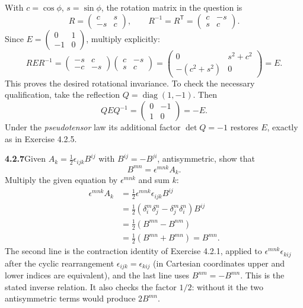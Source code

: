 With $c=\cos\phi$, $s=\sin\phi$, the rotation matrix in the question is
\[
R=\begin{pmatrix}c&s\\-s&c\end{pmatrix},\qquad
R^{-1}=R^{\mathsf T}=\begin{pmatrix}c&-s\\s&c\end{pmatrix}.
\]
Since $E=\begin{pmatrix}0&1\\-1&0\end{pmatrix}$, multiply explicitly:
\[
RER^{-1}
=\begin{pmatrix}-s&c\\-c&-s\end{pmatrix}
 \begin{pmatrix}c&-s\\s&c\end{pmatrix}
=\begin{pmatrix}0&s^2+c^2\\-(c^2+s^2)&0\end{pmatrix}
=E.
\]
This proves the desired rotational invariance. To check the necessary
qualification, take the reflection $Q=\operatorname{diag}(1,-1)$.
Then
\[
QEQ^{-1}=\begin{pmatrix}0&-1\\1&0\end{pmatrix}=-E.
\]
Under the \emph{pseudotensor} law its additional factor $\det Q=-1$
restores $E$, exactly as in Exercise 4.2.5.

\par\bigskip
\noindent\textbf{4.2.7}\quad Given
$A_{k}=\frac{1}{2}\epsilon_{ijk}B^{ij}$ with $B^{ij}=-B^{ji}$, antisymmetric,
show that
\[
B^{mn}=\epsilon^{mnk}A_{k}.
\]
\solution
Multiply the given equation by $\epsilon^{mnk}$ and sum $k$:
\begin{align*}
\epsilon^{mnk}A_k
&=\frac12\epsilon^{mnk}\epsilon_{ijk}B^{ij}\\
&=\frac12(\delta^m_i\delta^n_j-\delta^m_j\delta^n_i)B^{ij}\\
&=\frac12(B^{mn}-B^{nm})\\
&=\frac12(B^{mn}+B^{mn})=B^{mn}.
\end{align*}
The second line is the contraction identity of Exercise 4.2.1, applied
to $\epsilon^{mnk}\epsilon_{kij}$ after the cyclic rearrangement
$\epsilon_{ijk}=\epsilon_{kij}$ (in Cartesian coordinates upper and
lower indices are equivalent), and the last line uses $B^{nm}=-B^{mn}$.
This is the stated inverse relation. It also checks the factor $1/2$:
without it the two antisymmetric terms would produce $2B^{mn}$.

